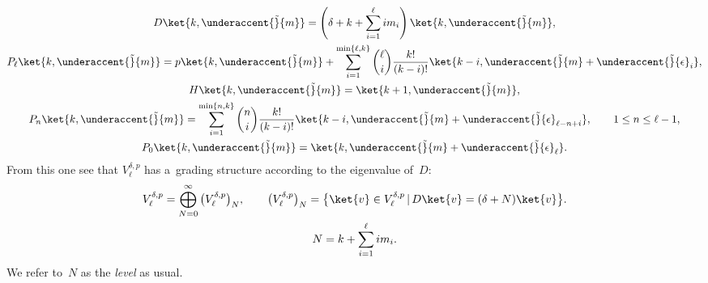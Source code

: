 \begin{gather*}
    D \ket{k,\underaccent{\tilde}{m}} = \left(\delta + k+ \sum\limits_{i=1}^{\ell} i   m_i\right) \ket{k,\underaccent{\tilde}{m}},
\nonumber
\\
    P_{\ell} \ket{k,\underaccent{\tilde}{m}} = p \ket{k,\underaccent{\tilde}{m}} + \sum\limits_{i=1}^{\min\{\ell,k\}}
\binom{\ell}{i} \frac{k!}{(k-i)!} \ket{k-i,\underaccent{\tilde}{m}+\underaccent{\tilde}{\epsilon}_{i}},
\nonumber
\\
    H \ket{k,\underaccent{\tilde}{m}}= \ket{k+1,\underaccent{\tilde}{m}},
\nonumber
\\
    P_n \ket{k,\underaccent{\tilde}{m}} = \sum\limits_{i=1}^{\min\{n,k\}} \binom{n}{i} \frac{k!}{(k-i)!}
\ket{k-i,\underaccent{\tilde}{m}+\underaccent{\tilde}{\epsilon}_{\ell-n+i}},
\qquad
1 \leq n \leq \ell-1,
\nonumber
\\
    P_0 \ket{k,\underaccent{\tilde}{m}} = \ket{k,\underaccent{\tilde}{m}+\underaccent{\tilde}{\epsilon}_{\ell}}.
\end{gather*}
From this one see that $ V^{\delta,p}_{\ell} $ has a~grading structure according to the eigenvalue of~$D$:
\begin{gather*}
    V^{\delta,p}_{\ell} = \bigoplus_{N=0}^{\infty} \big(V^{\delta,p}_{\ell}\big)_N,
\qquad
\big(V^{\delta,p}_{\ell}\big)_N = \big\{ \ket{v} \in V^{\delta,p}_{\ell} \, | \, D \ket{v} = (\delta+N) \ket{v} \big\}.
\\
    N = k+ \sum\limits_{i=1}^{\ell} i   m_i.
\end{gather*}
We refer to~$N$ as the \textit{level} as usual.


